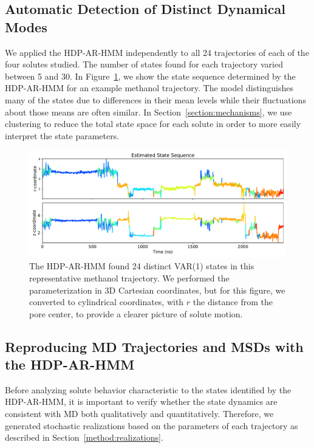 \documentclass[journal=jpcbfk,manuscript=article]{achemso}
\begin{document}
  \subsection{Automatic Detection of Distinct Dynamical Modes}\label{section:find_modes}
  
  We applied the HDP-AR-HMM independently to all 24 trajectories of each of the four solutes studied.
  The number of states found for each trajectory varied between 5 and 30.  %
  In Figure~\ref{fig:rz_unclustered}, we show the state sequence determined by the HDP-AR-HMM for
  an example methanol trajectory. The model distinguishes many of the states due to 
  differences in their mean levels while their fluctuations about those means are often 
  similar. In Section~\ref{section:mechanisms}, we use clustering to reduce the total state
  space for each solute in order to more easily interpret the state parameters.
  
  \begin{figure}
  \centering
  \includegraphics[width=\textwidth]{rz_unclustered_MET.pdf}
  \caption{The HDP-AR-HMM found 24 distinct VAR(1) states in this representative methanol trajectory.
  We performed the parameterization in 3D Cartesian coordinates, but for this figure, we 
  converted to cylindrical coordinates, with $r$ the distance from the pore center, to 
  provide a clearer picture of solute motion.}\label{fig:rz_unclustered}
  \end{figure}
  
  \subsection{Reproducing MD Trajectories and MSDs with the HDP-AR-HMM}\label{section:unclustered_MSD_prediction}

  Before analyzing solute behavior characteristic to the states identified by the
  HDP-AR-HMM, it is important to verify whether the state dynamics are consistent with MD
  both qualitatively and quantitatively. Therefore, we generated stochastic 
  realizations based on the parameters of each trajectory as described in 
  Section~\ref{method:realizations}.
  
\end{document}
